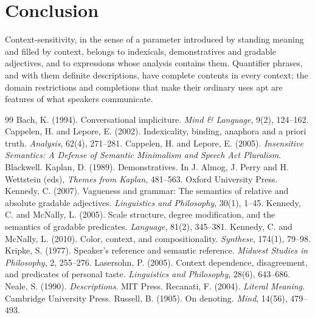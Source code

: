 \documentclass{situationist-preprint}
\begin{document}
\section{Conclusion}

Context-sensitivity, in the sense of a parameter introduced by standing meaning and filled by context, belongs to indexicals, demonstratives and gradable adjectives, and to expressions whose analysis contains them. Quantifier phrases, and with them definite descriptions, have complete contents in every context; the domain restrictions and completions that make their ordinary uses apt are features of what speakers communicate.

\begin{thebibliography}{99}\small
{} Bach, K. (1994). Conversational impliciture. \emph{Mind \& Language}, 9(2), 124--162.
 Cappelen, H. and Lepore, E. (2002). Indexicality, binding, anaphora and a priori truth. \emph{Analysis}, 62(4), 271--281.
 Cappelen, H. and Lepore, E. (2005). \emph{Insensitive Semantics: A Defense of Semantic Minimalism and Speech Act Pluralism}. Blackwell.
 Kaplan, D. (1989). Demonstratives. In J. Almog, J. Perry and H. Wettstein (eds), \emph{Themes from Kaplan}, 481--563. Oxford University Press.
 Kennedy, C. (2007). Vagueness and grammar: The semantics of relative and absolute gradable adjectives. \emph{Linguistics and Philosophy}, 30(1), 1--45.
 Kennedy, C. and McNally, L. (2005). Scale structure, degree modification, and the semantics of gradable predicates. \emph{Language}, 81(2), 345--381.
 Kennedy, C. and McNally, L. (2010). Color, context, and compositionality. \emph{Synthese}, 174(1), 79--98.
 Kripke, S. (1977). Speaker's reference and semantic reference. \emph{Midwest Studies in Philosophy}, 2, 255--276.
 Lasersohn, P. (2005). Context dependence, disagreement, and predicates of personal taste. \emph{Linguistics and Philosophy}, 28(6), 643--686.
 Neale, S. (1990). \emph{Descriptions}. MIT Press.
 Recanati, F. (2004). \emph{Literal Meaning}. Cambridge University Press.
 Russell, B. (1905). On denoting. \emph{Mind}, 14(56), 479--493.

\end{thebibliography}
\end{document}
